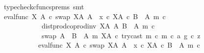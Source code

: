 \begin{isabellebody}
\ {\isacharparenleft}{\kern0pt}typecheck{\isacharunderscore}{\kern0pt}cfuncs{\isacharunderscore}{\kern0pt}prems{\isacharcomma}{\kern0pt}\ smt{\isacharparenright}{\kern0pt}\isanewline
\ \ \ \ \ \ \ \ \ \ \isamarkupfalse%
\ \isamarkupfalse%
\ {\isachardoublequoteopen}{\isacharparenleft}{\kern0pt}eval{\isacharunderscore}{\kern0pt}func\ X\ A\ {\isasymcirc}\isactrlsub c\ swap\ {\isacharparenleft}{\kern0pt}X\isactrlbsup A\isactrlesup {\isacharparenright}{\kern0pt}\ A{\isacharparenright}{\kern0pt}\ {\isasymamalg}\ {\isacharparenleft}{\kern0pt}x\ {\isasymcirc}\isactrlsub c\ {\isasymbeta}\isactrlbsub X\isactrlbsup A\isactrlesup \ {\isasymtimes}\isactrlsub c\ {\isacharparenleft}{\kern0pt}B\ {\isasymsetminus}\ {\isacharparenleft}{\kern0pt}A{\isacharcomma}{\kern0pt}\ m{\isacharparenright}{\kern0pt}{\isacharparenright}{\kern0pt}\isactrlesub {\isacharparenright}{\kern0pt}\ {\isasymcirc}\isactrlsub c\isanewline
\ \ \ \ \ \ \ \ \ \ \ \ dist{\isacharunderscore}{\kern0pt}prod{\isacharunderscore}{\kern0pt}coprod{\isacharunderscore}{\kern0pt}inv\ {\isacharparenleft}{\kern0pt}X\isactrlbsup A\isactrlesup {\isacharparenright}{\kern0pt}\ A\ {\isacharparenleft}{\kern0pt}B\ {\isasymsetminus}\ {\isacharparenleft}{\kern0pt}A{\isacharcomma}{\kern0pt}\ m{\isacharparenright}{\kern0pt}{\isacharparenright}{\kern0pt}\ {\isasymcirc}\isactrlsub c\isanewline
\ \ \ \ \ \ \ \ \ \ \ \ swap\ {\isacharparenleft}{\kern0pt}A\ {\isasymCoprod}\ {\isacharparenleft}{\kern0pt}B\ {\isasymsetminus}\ {\isacharparenleft}{\kern0pt}A{\isacharcomma}{\kern0pt}\ m{\isacharparenright}{\kern0pt}{\isacharparenright}{\kern0pt}{\isacharparenright}{\kern0pt}\ {\isacharparenleft}{\kern0pt}X\isactrlbsup A\isactrlesup {\isacharparenright}{\kern0pt}\ {\isasymcirc}\isactrlsub c\ {\isasymlangle}{\isacharparenleft}{\kern0pt}try{\isacharunderscore}{\kern0pt}cast\ m\ {\isasymcirc}\isactrlsub c\ m{\isacharparenright}{\kern0pt}\ {\isasymcirc}\isactrlsub c\ a{\isacharcomma}{\kern0pt}\ g\ {\isasymcirc}\isactrlsub c\ z{\isasymrangle}\isanewline
\ \ \ \ \ \ \ \ \ \ {\isacharequal}{\kern0pt}\ {\isacharparenleft}{\kern0pt}eval{\isacharunderscore}{\kern0pt}func\ X\ A\ {\isasymcirc}\isactrlsub c\ swap\ {\isacharparenleft}{\kern0pt}X\isactrlbsup A\isactrlesup {\isacharparenright}{\kern0pt}\ A{\isacharparenright}{\kern0pt}\ {\isasymamalg}\ {\isacharparenleft}{\kern0pt}x\ {\isasymcirc}\isactrlsub c\ {\isasymbeta}\isactrlbsub X\isactrlbsup A\isactrlesup \ {\isasymtimes}\isactrlsub c\ {\isacharparenleft}{\kern0pt}B\ {\isasymsetminus}\ {\isacharparenleft}{\kern0pt}A{\isacharcomma}{\kern0pt}\ m{\isacharparenright}{\kern0pt}{\isacharparenright}{\kern0pt}\isactrlesub {\isacharparenright}{\kern0pt}\ {\isasymcirc}\isactrlsub c\isanewline

\end{isabellebody}
